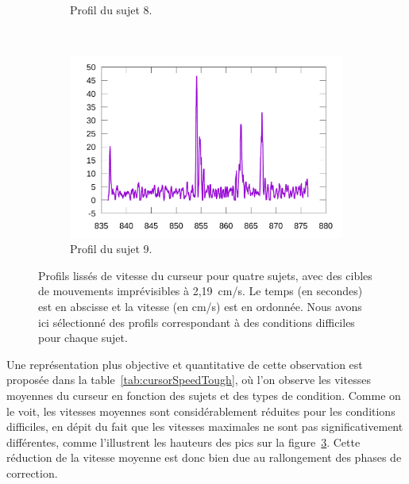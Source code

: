 \begin{figure}[!htb]
\begin{subfigure}[t]{\subImgWlineplot}
			\caption{Profil du sujet 8.}
			\label{fig:hardProfile8}
		\end{subfigure}
		~
		\begin{subfigure}[t]{\subImgWlineplot}
			\centering
			\includegraphics[width=\textwidth]{figures/ch4/subject_09_30_30_219_smoothed}
			\caption{Profil du sujet 9.}
			\label{fig:hardProfile9}
		\end{subfigure}
		\caption[Profils de vitesse du curseur, conditions]{Profils lissés de vitesse du curseur pour quatre sujets, avec des cibles de mouvements imprévisibles à 2,19~cm/s. Le temps (en secondes) est en abscisse et la vitesse (en cm/s) est en ordonnée. Nous avons ici sélectionné des profils correspondant à des conditions difficiles pour chaque sujet.}
		\label{fig:hardProfiles}
	\end{figure}
	
	Une représentation plus objective et quantitative de cette observation est proposée dans la table~\ref{tab:cursorSpeedTough}, où l'on observe les vitesses moyennes du curseur en fonction des sujets et des types de condition. Comme on le voit, les vitesses moyennes sont considérablement réduites pour les conditions difficiles, en dépit du fait que les vitesses maximales ne sont pas significativement différentes, comme l'illustrent les hauteurs des pics sur la figure~\ref{fig:hardProfiles}. Cette réduction de la vitesse moyenne est donc bien due au rallongement des phases de correction.
	
